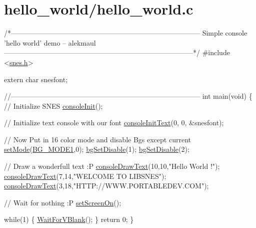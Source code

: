 \hypertarget{a00388}{}\section{hello\+\_\+world/hello\+\_\+world.\+c}

\begin{DoxyCodeInclude}
\textcolor{comment}{/*---------------------------------------------------------------------------------}
\textcolor{comment}{}
\textcolor{comment}{}
\textcolor{comment}{    Simple console 'hello world' demo}
\textcolor{comment}{    -- alekmaul}
\textcolor{comment}{}
\textcolor{comment}{}
\textcolor{comment}{---------------------------------------------------------------------------------*/}
\textcolor{preprocessor}{#include <\hyperlink{a00356}{snes.h}>}

\textcolor{keyword}{extern} \textcolor{keywordtype}{char} snesfont;

\textcolor{comment}{//---------------------------------------------------------------------------------}
\textcolor{keywordtype}{int} main(\textcolor{keywordtype}{void}) \{
    \textcolor{comment}{// Initialize SNES }
    \hyperlink{a00320_a6047713bb5a73afd3cd1d77e336bcdad}{consoleInit}();
    
    \textcolor{comment}{// Initialize text console with our font}
    \hyperlink{a00320_a458fa049800e12429ca0ba401e513746}{consoleInitText}(0, 0, &snesfont);

    \textcolor{comment}{// Now Put in 16 color mode and disable Bgs except current}
    \hyperlink{a00353_afd9e46ae627d055dd8c98a4b0ebb73b1}{setMode}(\hyperlink{a00317_a05c862edb7f8f75036f10c04dcc3c2a6}{BG\_MODE1},0);  \hyperlink{a00317_a4dbfb1b8854ff9ca4a7d11a899281bbb}{bgSetDisable}(1);  
      \hyperlink{a00317_a4dbfb1b8854ff9ca4a7d11a899281bbb}{bgSetDisable}(2);

    \textcolor{comment}{// Draw a wonderfull text :P}
    \hyperlink{a00320_a7e52d15b5a1befa42f5758de19dfb70c}{consoleDrawText}(10,10,\textcolor{stringliteral}{"Hello World !"});
    \hyperlink{a00320_a7e52d15b5a1befa42f5758de19dfb70c}{consoleDrawText}(7,14,\textcolor{stringliteral}{"WELCOME TO LIBSNES"});
    \hyperlink{a00320_a7e52d15b5a1befa42f5758de19dfb70c}{consoleDrawText}(3,18,\textcolor{stringliteral}{"HTTP://WWW.PORTABLEDEV.COM"});

    \textcolor{comment}{// Wait for nothing :P}
    \hyperlink{a00353_abc7d4ef8ebc22f5b710927909bb3f144}{setScreenOn}();  
    
    \textcolor{keywordflow}{while}(1) \{
        \hyperlink{a00326_a815e2626bd26d0e936d507a363ecd723}{WaitForVBlank}();
    \}
    \textcolor{keywordflow}{return} 0;
\}
\end{DoxyCodeInclude}
 